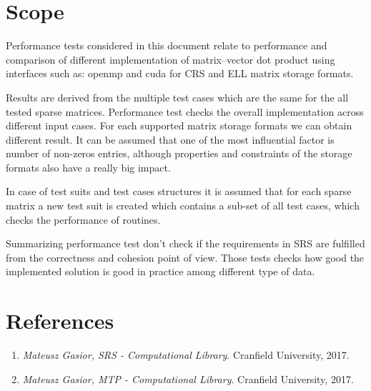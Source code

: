 \section{Scope} \label{s:introduction:scope}
	\begin{comment}
		Identify the test items (software or system) that are the object of testing, e.g., specific attributes of the
		software, the installation instructions, the user instructions, interfacing hardware, database conversion
		software that is not a part of the operational system) including their version/revision level. Also
		identify any procedures for their transfer from other environments to the test environment.
		Supply references to the test item documentation relevant to an individual level of test, if it exists, such
		as follows:
		⎯ Requirements
		⎯ Design
		⎯ User’s guide
		⎯ Operations guide
		⎯ Installation guide
		Reference any Anomaly Reports relating to the test items.
		Identify any items that are to be specifically excluded from testing.
	\end{comment}
	Performance tests considered in this document relate to performance and comparison of different implementation of matrix--vector dot product using interfaces such as: \gls{openmp} and \gls{cuda} for \gls{CRS} and \gls{ELL} matrix storage formats. 
	
	Results are derived from the multiple test cases which are the same for the all tested sparse matrices. Performance test checks the overall implementation across different input cases. For each supported matrix storage formats we can obtain different result. It can be assumed that one of the most influential factor is number of non-zeros entries, although properties and constraints of the storage formats also have a really big impact.
	
	In case of test suits and test cases structures it is assumed that for each sparse matrix a new test suit is created which contains a sub-set of all test cases, which checks the performance of routines.
	
	Summarizing performance test don't check if the requirements in \gls{SRS} are fulfilled from the correctness and cohesion point of view. Those tests checks how good the implemented solution is good in practice among different type of data.
	
\section{References} \label{s:introduction:references}
	\begin{comment}
		List all of the applicable reference documents. The references are separated into “external” references
		that are imposed external to the project and “internal” references that are imposed from within to the
		project. This may also be at the end of the document.
	\end{comment}
	\begin{enumerate}
		\item \emph{Mateusz Gasior, \gls{SRS} - Computational Library}. Cranfield University, 2017.
		\item \emph{Mateusz Gasior, \gls{MTP} - Computational Library}. Cranfield University, 2017. 
	\end{enumerate}